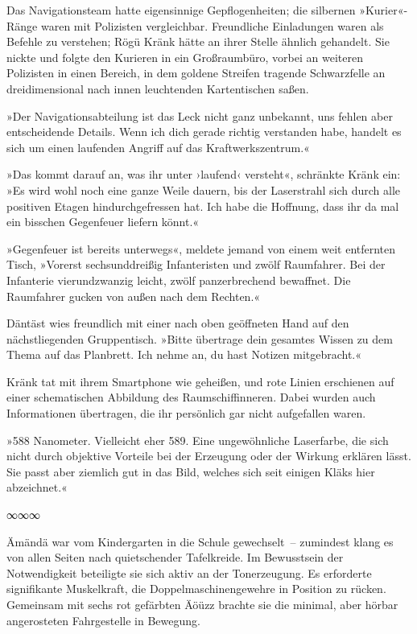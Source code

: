 Das Navigationsteam hatte eigensinnige Gepflogenheiten; die silbernen »Kurier«-Ränge waren mit Polizisten vergleichbar. Freundliche Einladungen waren als Befehle zu verstehen; Rögü Kränk hätte an ihrer Stelle ähnlich gehandelt. Sie nickte und folgte den Kurieren in ein Großraumbüro, vorbei an weiteren Polizisten in einen Bereich, in dem goldene Streifen tragende Schwarzfelle an dreidimensional nach innen leuchtenden Kartentischen saßen.

»Der Navigationsabteilung ist das Leck nicht ganz unbekannt, uns fehlen aber entscheidende Details. Wenn ich dich gerade richtig verstanden habe, handelt es sich um einen laufenden Angriff auf das Kraftwerkszentrum.«

»Das kommt darauf an, was ihr unter ›laufend‹ versteht«, schränkte Kränk ein: »Es wird wohl noch eine ganze Weile dauern, bis der Laserstrahl sich durch alle positiven Etagen hindurchgefressen hat. Ich habe die Hoffnung, dass ihr da mal ein bisschen Gegenfeuer liefern könnt.«

»Gegenfeuer ist bereits unterwegs«, meldete jemand von einem weit entfernten Tisch, »Vorerst sechsunddreißig Infanteristen und zwölf Raumfahrer. Bei der Infanterie vierundzwanzig leicht, zwölf panzerbrechend bewaffnet. Die Raumfahrer gucken von außen nach dem Rechten.«

Däntäst wies freundlich mit einer nach oben geöffneten Hand auf den nächstliegenden Gruppentisch. »Bitte übertrage dein gesamtes Wissen zu dem Thema auf das Planbrett. Ich nehme an, du hast Notizen mitgebracht.«

Kränk tat mit ihrem Smartphone wie geheißen, und rote Linien erschienen auf einer schematischen Abbildung des Raumschiffinneren. Dabei wurden auch Informationen übertragen, die ihr persönlich gar nicht aufgefallen waren.

»588 Nanometer. Vielleicht eher 589. Eine ungewöhnliche Laserfarbe, die sich nicht durch objektive Vorteile bei der Erzeugung oder der Wirkung erklären lässt. Sie passt aber ziemlich gut in das Bild, welches sich seit einigen Kläks hier abzeichnet.«

\begin{center}
∞∞∞
\end{center}

Ämändä war vom Kindergarten in die Schule gewechselt~– zumindest klang es von allen Seiten nach quietschender Tafelkreide. Im Bewusstsein der Notwendigkeit beteiligte sie sich aktiv an der Tonerzeugung. Es erforderte signifikante Muskelkraft, die Doppelmaschinengewehre in Position zu rücken. Gemeinsam mit sechs rot gefärbten Äöüzz brachte sie die minimal, aber hörbar angerosteten Fahrgestelle in Bewegung.

